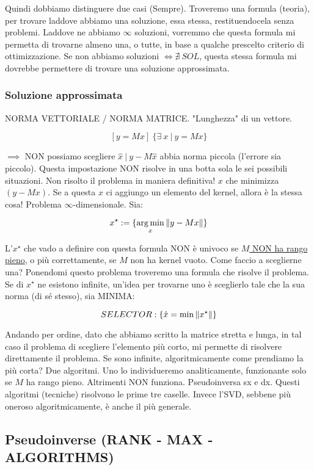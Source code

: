 Quindi dobbiamo distinguere due casi (Sempre). Troveremo una formula (teoria), per trovare laddove abbiamo una soluzione, essa stessa, restituendocela senza problemi. Laddove ne abbiamo $\infty$ soluzioni, vorremmo che questa formula mi permetta di trovarne almeno una, o tutte, in base a qualche prescelto criterio di ottimizzazione. Se non abbiamo soluzioni $\iff\nexists\ SOL$, questa stessa formula mi dovrebbe permettere di trovare una soluzione approssimata.

\subsubsection{Soluzione approssimata}

NORMA VETTORIALE / NORMA MATRICE. "Lunghezza" di un vettore.

\[
	[y=Mx]\ \{\exists\ x\ |\ y=Mx\}
\]

$\implies$ NON possiamo scegliere $\hat{x}\ |\ y-M\hat{x}$ abbia norma piccola (l'errore sia piccolo). Questa impostazione NON risolve in una botta sola le sei possibili situazioni. Non risolto il problema in maniera definitiva! $x$ che minimizza $(y-Mx)$. Se a questa $x$ ci aggiungo un elemento del kernel, allora è la stessa cosa! Problema $\infty$-dimensionale. Sia:

\[
	x^\star := \{\operatorname*{arg\,min}_x{\lVert y-Mx\rVert}\}
\]

L'$x^\star$ che vado a definire con questa formula NON è univoco se \underline{$M$ NON ha rango pieno}, o più correttamente, se $M$ non ha kernel vuoto. Come faccio a sceglierne una? Ponendomi questo problema troveremo una formula che risolve il problema. Se di $x^\star$ ne esistono infinite, un'idea per trovarne uno è sceglierlo tale che la sua norma (di sé stesso), sia MINIMA:

\[
	SELECTOR: \{\hat{x}=\min{\lVert x^\star\rVert}\}
\]

Andando per ordine, dato che abbiamo scritto la matrice stretta e lunga, in tal caso il problema di scegliere l'elemento più corto, mi permette di risolvere direttamente il problema. Se sono infinite, algoritmicamente come prendiamo la più corta? Due algoritmi. Uno lo individueremo analiticamente, funzionante solo se $M$ ha rango pieno. Altrimenti NON funziona. Pseudoinversa sx e dx. Questi algoritmi (tecniche) risolvono le prime tre caselle. Invece l'SVD, sebbene più oneroso algoritmicamente, è anche il più generale.

\subsection{Pseudoinverse (RANK - MAX - ALGORITHMS)}

